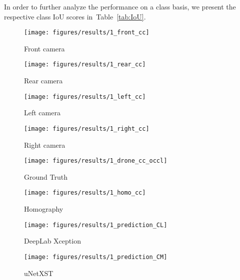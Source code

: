 \documentclass[a4paper, 10pt, conference]{ieeeconf}
\newcommand{\tab}[1]{Table~\ref{#1}}
\begin{document}
In order to further analyze the performance on a class basis, we present the respective class IoU scores in~\tab{tab:IoU}.

\begin{figure*}[!t]
  \captionsetup[subfigure]{skip=0pt}
  \begin{subfigure}[b]{0.2425\textwidth}
    \caption*{Front camera}
    \texttt{[image: figures/results/1\_front\_cc]}
  \end{subfigure}
  \hfill
  \begin{subfigure}[b]{0.2425\textwidth}
    \caption*{Rear camera}
    \texttt{[image: figures/results/1\_rear\_cc]}
  \end{subfigure}
  \hfill
  \begin{subfigure}[b]{0.2425\textwidth}
    \caption*{Left camera}
    \texttt{[image: figures/results/1\_left\_cc]}
  \end{subfigure}
  \hfill
  \begin{subfigure}[b]{0.2425\textwidth}
    \caption*{Right camera}
    \texttt{[image: figures/results/1\_right\_cc]}
  \end{subfigure}

  \vspace{0.5\baselineskip}
  \captionsetup[subfigure]{skip=2pt}
  \begin{subfigure}[b]{0.2425\textwidth}
    \texttt{[image: figures/results/1\_drone\_cc\_occl]}
    \caption*{Ground Truth}
  \end{subfigure}
  \hfill
  \begin{subfigure}[b]{0.2425\textwidth}
    \texttt{[image: figures/results/1\_homo\_cc]}
    \caption*{Homography}
  \end{subfigure}
  \hfill
  \begin{subfigure}[b]{0.2425\textwidth}
    \texttt{[image: figures/results/1\_prediction\_CL]}
    \caption*{DeepLab Xception}
  \end{subfigure}
  \hfill
  \begin{subfigure}[b]{0.2425\textwidth}
    \texttt{[image: figures/results/1\_prediction\_CM]}
    \caption*{uNetXST}
  \end{subfigure}


\end{figure*}
\end{document}
